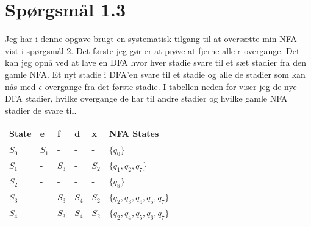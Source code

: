\documentclass[danish,a4paper]{report}
\begin{document}
\begin{center}
\end{center}
\newpage
\section*{Spørgsmål 1.3}

Jeg har i denne opgave brugt en systematisk tilgang til at oversætte min NFA vist i spørgsmål 2. Det første jeg gør er at prøve at fjerne alle $\epsilon$ overgange. Det kan jeg opnå ved at lave en DFA hvor hver stadie svare til et sæt stadier fra den gamle NFA. Et nyt stadie i DFA'en svare til et stadie og alle de stadier som kan nås med $\epsilon$ overgange fra det første stadie. I tabellen neden for viser jeg de nye DFA stadier, hvilke overgange de har til andre stadier og hvilke gamle NFA stadier de svare til.
\begin{table}[h]
\centering
\begin{tabular}{|l|l|l|l|l|l|}
\hline
State      & e   & f   & d   & x      & NFA States                            \\ \hline
$S_0$      & $S_1$  & -      & -      & -     & $\{q_0\}$                     \\
$S_1$      & -      & $S_3$  & -      & $S_2$ & $\{q_1, q_2, q_7\}$           \\
$S_2$      & -      & -      & -      & -     & $\{q_8\}$                     \\
$S_3$      & -      & $S_3$  & $S_4$  & $S_2$ & $\{q_2, q_3, q_4, q_5, q_7\}$ \\
$S_4$      & -      & $S_3$  & $S_4$  & $S_2$ & $\{q_2, q_4, q_5, q_6, q_7\}$ \\ \hline
\end{tabular}
\end{table}
\end{document}
